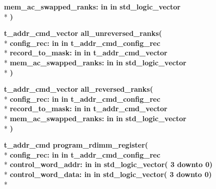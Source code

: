 \begin{DoxyCompactItemize}
{\bfseries \textcolor{vhdlchar}{mem\+\_\+ac\+\_\+swapped\+\_\+ranks\+: }\textcolor{stringliteral}{in }\textcolor{vhdlchar}{in std\+\_\+logic\+\_\+vector}}\\*
{\bfseries  )} 
\item 
{\bfseries {\bfseries \textcolor{vhdlchar}{t\+\_\+addr\+\_\+cmd\+\_\+vector}\textcolor{vhdlchar}{ }}} {\bf all\+\_\+unreversed\+\_\+ranks}{\bfseries  ( }\\*
{\bfseries \textcolor{vhdlchar}{config\+\_\+rec\+: }\textcolor{stringliteral}{in }\textcolor{vhdlchar}{in t\+\_\+addr\+\_\+cmd\+\_\+config\+\_\+rec}}\\*
{\bfseries \textcolor{vhdlchar}{record\+\_\+to\+\_\+mask\+: }\textcolor{stringliteral}{in }\textcolor{vhdlchar}{in t\+\_\+addr\+\_\+cmd\+\_\+vector}}\\*
{\bfseries \textcolor{vhdlchar}{mem\+\_\+ac\+\_\+swapped\+\_\+ranks\+: }\textcolor{stringliteral}{in }\textcolor{vhdlchar}{in std\+\_\+logic\+\_\+vector}}\\*
{\bfseries  )} 
\item 
{\bfseries {\bfseries \textcolor{vhdlchar}{t\+\_\+addr\+\_\+cmd\+\_\+vector}\textcolor{vhdlchar}{ }}} {\bf all\+\_\+reversed\+\_\+ranks}{\bfseries  ( }\\*
{\bfseries \textcolor{vhdlchar}{config\+\_\+rec\+: }\textcolor{stringliteral}{in }\textcolor{vhdlchar}{in t\+\_\+addr\+\_\+cmd\+\_\+config\+\_\+rec}}\\*
{\bfseries \textcolor{vhdlchar}{record\+\_\+to\+\_\+mask\+: }\textcolor{stringliteral}{in }\textcolor{vhdlchar}{in t\+\_\+addr\+\_\+cmd\+\_\+vector}}\\*
{\bfseries \textcolor{vhdlchar}{mem\+\_\+ac\+\_\+swapped\+\_\+ranks\+: }\textcolor{stringliteral}{in }\textcolor{vhdlchar}{in std\+\_\+logic\+\_\+vector}}\\*
{\bfseries  )} 
\item 
{\bfseries {\bfseries \textcolor{vhdlchar}{t\+\_\+addr\+\_\+cmd}\textcolor{vhdlchar}{ }}} {\bf program\+\_\+rdimm\+\_\+register}{\bfseries  ( }\\*
{\bfseries \textcolor{vhdlchar}{config\+\_\+rec\+: }\textcolor{stringliteral}{in }\textcolor{vhdlchar}{in t\+\_\+addr\+\_\+cmd\+\_\+config\+\_\+rec}}\\*
{\bfseries \textcolor{vhdlchar}{control\+\_\+word\+\_\+addr\+: }\textcolor{stringliteral}{in }\textcolor{vhdlchar}{in std\+\_\+logic\+\_\+vector( 3 downto  0)}}\\*
{\bfseries \textcolor{vhdlchar}{control\+\_\+word\+\_\+data\+: }\textcolor{stringliteral}{in }\textcolor{vhdlchar}{in std\+\_\+logic\+\_\+vector( 3 downto  0)}}\\*

\end{DoxyCompactItemize}
